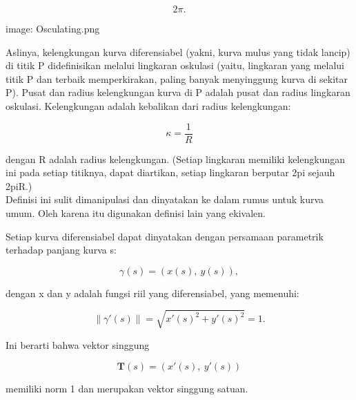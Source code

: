 \documentclass[a4paper,10pt]{article}
\begin{document}
\begin{eulernotebook}
\begin{eulercomment}
\end{eulercomment}
\begin{eulerformula}
\[
2\pi.
\]
\end{eulerformula}
\begin{eulercomment}
image: Osculating.png

Aslinya, kelengkungan kurva diferensiabel (yakni, kurva mulus yang
tidak lancip) di titik P didefinisikan melalui lingkaran oskulasi
(yaitu, lingkaran yang melalui titik P dan terbaik memperkirakan,
paling banyak menyinggung kurva di sekitar P). Pusat dan radius
kelengkungan kurva di P adalah pusat dan radius lingkaran oskulasi.
Kelengkungan adalah kebalikan dari radius kelengkungan:

\end{eulercomment}
\begin{eulerformula}
\[
\kappa =\frac {1}{R}
\]
\end{eulerformula}
\begin{eulercomment}
dengan R adalah radius kelengkungan. (Setiap lingkaran memiliki
kelengkungan ini pada setiap titiknya, dapat diartikan, setiap
lingkaran berputar 2pi sejauh 2piR.)\\
Definisi ini sulit dimanipulasi dan dinyatakan ke dalam rumus untuk
kurva umum. Oleh karena itu digunakan definisi lain yang ekivalen.

\end{eulercomment}
\begin{eulercomment}
Setiap kurva diferensiabel dapat dinyatakan dengan persamaan
parametrik terhadap panjang kurva s:

\end{eulercomment}
\begin{eulerformula}
\[
\gamma(s) = (x(s),\ y(s)),
\]
\end{eulerformula}
\begin{eulercomment}
dengan x dan y adalah fungsi riil yang diferensiabel, yang memenuhi:

\end{eulercomment}
\begin{eulerformula}
\[
\|\gamma'(s)\|=\sqrt{x'(s)^2+y'(s)^2}=1.
\]
\end{eulerformula}
\begin{eulercomment}
Ini berarti bahwa vektor singgung


\end{eulercomment}
\begin{eulerformula}
\[
\mathbf{T}(s)=(x'(s),\ y'(s))
\]
\end{eulerformula}
\begin{eulercomment}
memiliki norm 1 dan merupakan vektor singgung satuan.


\end{eulercomment}
\end{eulernotebook}
\end{document}
